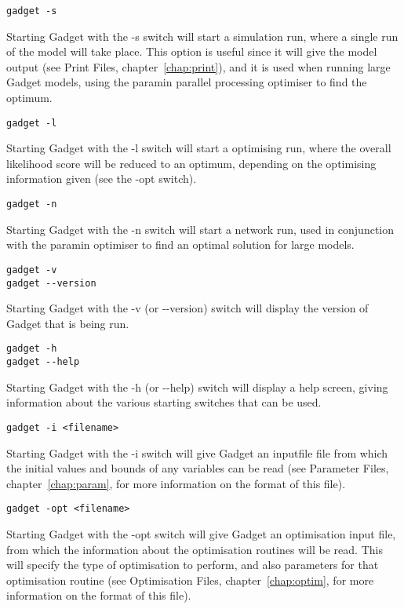 \documentclass[10pt,twoside]{book}
\begin{document}
{\small\begin{verbatim}
gadget -s
\end{verbatim}}
Starting Gadget with the -s switch will start a simulation run, where a single run of the model will take place.  This option is useful since it will give the model output (see Print Files, chapter~\ref{chap:print}), and it is used when running large Gadget models, using the paramin parallel processing optimiser to find the optimum.

{\small\begin{verbatim}
gadget -l
\end{verbatim}}
Starting Gadget with the -l switch will start a optimising run, where the overall likelihood score will be reduced to an optimum, depending on the optimising information given (see the -opt switch).

{\small\begin{verbatim}
gadget -n
\end{verbatim}}
Starting Gadget with the -n switch will start a network run, used in conjunction with the paramin optimiser to find an optimal solution for large models.

{\small\begin{verbatim}
gadget -v
gadget --version
\end{verbatim}}
Starting Gadget with the -v (or -\hspace{0pt}-version) switch will display the version of Gadget that is being run.

{\small\begin{verbatim}
gadget -h
gadget --help
\end{verbatim}}
Starting Gadget with the -h (or -\hspace{0pt}-help) switch will display a help screen, giving information about the various starting switches that can be used.

{\small\begin{verbatim}
gadget -i <filename>
\end{verbatim}}
Starting Gadget with the -i switch will give Gadget an inputfile file from which the initial values and bounds of any variables can be read (see Parameter Files, chapter~\ref{chap:param}, for more information on the format of this file).

{\small\begin{verbatim}
gadget -opt <filename>
\end{verbatim}}
Starting Gadget with the -opt switch will give Gadget an optimisation input file, from which the information about the optimisation routines will be read.  This will specify the type of optimisation to perform, and also parameters for that optimisation routine (see Optimisation Files, chapter~\ref{chap:optim}, for more information on the format of this file).
\end{document}
